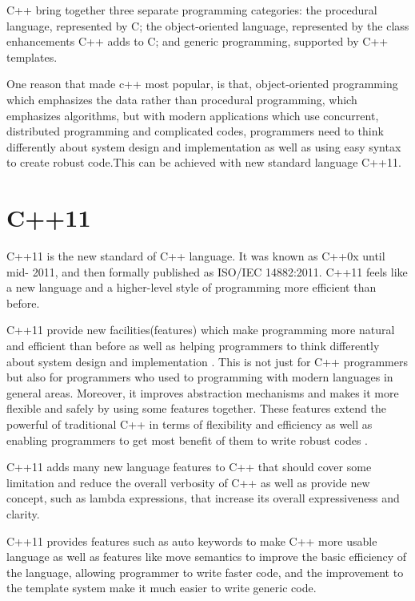 \documentclass[12pt]{report}
\begin{document}
C++ bring together three separate programming categories: the procedural language, represented by C; the object-oriented language, represented by the class enhancements C++ adds to C; and generic programming, supported by C++ templates\cite{Prata:2012:Cpp}.

One reason that made c++ most popular, is that, object-oriented programming which emphasizes the data rather than procedural programming, which emphasizes algorithms, but with modern applications which use concurrent, distributed programming and complicated codes, programmers need to think differently about system design and implementation as well as using easy syntax  to create robust code.This can be achieved with new standard language C++11\cite{Stroustrup:2012:Cpp11}.

\section{C++11}
\label{section: C++11}
C++11 is the new standard of C++ language. It was known as C++0x until mid- 2011, and then formally published as ISO/IEC 14882:2011. C++11 feels like a new language and a higher-level style of programming more efficient than before\cite{ISO:2011:Cpplanguage}. 

C++11 provide new facilities(features) which make programming more natural and efficient than before as well as helping programmers to think differently about system design and implementation \cite{Stroustrup:2012:Cpp11}. This is not just for C++ programmers but also for programmers who used to programming with modern languages in general areas. Moreover, it improves abstraction mechanisms and makes it more flexible and safely by using some features together. These features extend the powerful of traditional C++ in terms of flexibility and efficiency as well as enabling programmers to get most benefit of them to write robust codes \cite{ISO:2011:Cpplanguage}.

C++11 adds many new language features to C++ that should cover some limitation and reduce the overall verbosity of C++ as well as provide new concept, such as lambda expressions, that increase its overall expressiveness and clarity.

C++11 provides features such as auto keywords to make C++ more usable language as well as features like move semantics to improve the basic efficiency of the language, allowing programmer to write faster code, and the improvement to the template system make it much easier to write generic code\cite{Stroustrup:2005:Cpp}.
\end{document}

